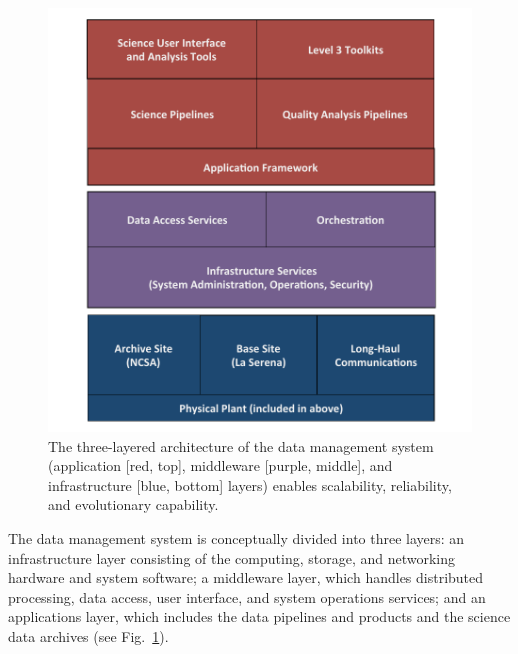 \documentclass[11pt,twoside]{article}
\begin{document}
\begin{figure}
%
%
\hskip -0.2in
\includegraphics[width=1.1\hsize,clip]{DMsandwich.pdf}
\caption{The three-layered architecture of the data management system 
(application [red, top], middleware [purple, middle], and infrastructure [blue, bottom] layers) enables scalability, reliability, and evolutionary capability.} 
\label{Fig:DM1}
\end{figure}

The data management system is conceptually divided into three layers: an
infrastructure layer consisting of the computing, storage, and
networking hardware and system software; a middleware layer, which
handles distributed processing, data access, user interface, and
system operations services; and an applications layer, which includes
the data pipelines and products and the science data archives (see
Fig.~\ref{Fig:DM1}).
\end{document}

